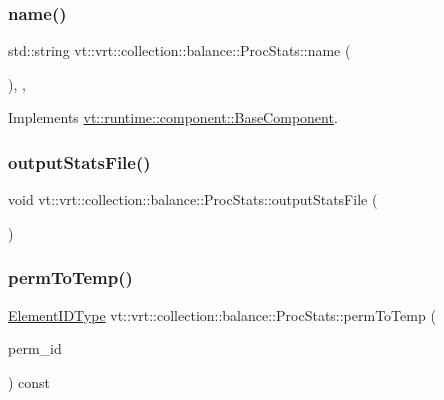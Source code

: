 \subsubsection{\texorpdfstring{name()}{name()}}
{\footnotesize\ttfamily std\+::string vt\+::vrt\+::collection\+::balance\+::\+Proc\+Stats\+::name (\begin{DoxyParamCaption}{ }\end{DoxyParamCaption})\hspace{0.3cm}{\ttfamily [inline]}, {\ttfamily [override]}, {\ttfamily [virtual]}}



Implements \hyperlink{structvt_1_1runtime_1_1component_1_1_base_component_a7701485f3539f78d42e6bad47fc7eb78}{vt\+::runtime\+::component\+::\+Base\+Component}.

\mbox{\label{structvt_1_1vrt_1_1collection_1_1balance_1_1_proc_stats_a543211533c1c2c348137069e945432a5}} 
\subsubsection{\texorpdfstring{output\+Stats\+File()}{outputStatsFile()}}
{\footnotesize\ttfamily void vt\+::vrt\+::collection\+::balance\+::\+Proc\+Stats\+::output\+Stats\+File (\begin{DoxyParamCaption}{ }\end{DoxyParamCaption})}

\mbox{\label{structvt_1_1vrt_1_1collection_1_1balance_1_1_proc_stats_a5b3d280cadc1a2d06de37b5d2da41ba8}} 
\subsubsection{\texorpdfstring{perm\+To\+Temp()}{permToTemp()}}
{\footnotesize\ttfamily \hyperlink{namespacevt_1_1vrt_1_1collection_1_1balance_a14c8d2c972f2913aa3f1636e5be0a120}{Element\+I\+D\+Type} vt\+::vrt\+::collection\+::balance\+::\+Proc\+Stats\+::perm\+To\+Temp (\begin{DoxyParamCaption}\item[{\hyperlink{namespacevt_1_1vrt_1_1collection_1_1balance_a14c8d2c972f2913aa3f1636e5be0a120}{Element\+I\+D\+Type}}]{perm\+\_\+id }\end{DoxyParamCaption}) const}

